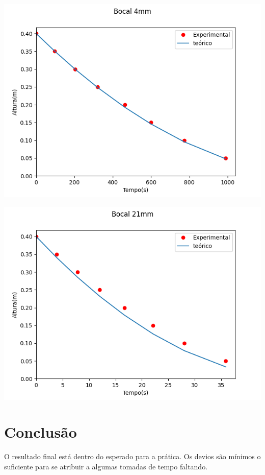 \documentclass[12pt]{article}
\begin{document}
\begin{center}
    \includegraphics{bocal4.png}

    \includegraphics{bocal21.png}

\end{center}


\section{Conclusão}

\tab O resultado final está dentro do esperado para a prática. Os devios são mínimos o suficiente para se atribuir a algumas tomadas de tempo faltando.
\end{document}
